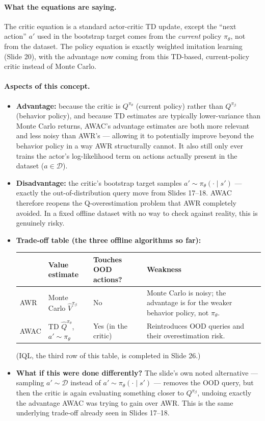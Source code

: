\documentclass[11pt]{article}
\begin{document}
\paragraph{What the equations are saying.}
The critic equation is a standard actor-critic TD update, except the ``next action''
$a'$ used in the bootstrap target comes from the \emph{current} policy $\pi_\theta$, not
from the dataset. The policy equation is exactly weighted imitation learning (Slide 20),
with the advantage now coming from this TD-based, current-policy critic instead of
Monte Carlo.

\paragraph{Aspects of this concept.}
\begin{itemize}
\item \textbf{Advantage:} because the critic is $Q^{\pi_\theta}$ (current policy) rather
than $Q^{\pi_\beta}$ (behavior policy), and because TD estimates are typically
lower-variance than Monte Carlo returns, AWAC's advantage estimates are both more
relevant and less noisy than AWR's --- allowing it to potentially improve beyond the
behavior policy in a way AWR structurally cannot. It also still only ever trains the
actor's log-likelihood term on actions actually present in the dataset ($a\in\mathcal{D}$).
\item \textbf{Disadvantage:} the critic's bootstrap target samples
$a'\sim\pi_\theta(\cdot\mid s')$ --- exactly the out-of-distribution query move from
Slides 17--18. AWAC therefore reopens the Q-overestimation problem that AWR completely
avoided. In a fixed offline dataset with no way to check against reality, this is
genuinely risky.
\item \textbf{Trade-off table (the three offline algorithms so far):}
\begin{center}
\begin{tabular}{@{}p{2cm}p{3.3cm}p{2.3cm}p{6.4cm}@{}}
\toprule
& Value estimate & Touches OOD actions? & Weakness \\
\midrule
AWR & Monte Carlo $\hat V^{\pi_\beta}$ & No & Monte Carlo is noisy; the advantage is for
the weaker behavior policy, not $\pi_\theta$. \\
AWAC & TD $\hat Q^{\pi_\theta}$, $a'\sim\pi_\theta$ & Yes (in the critic) & Reintroduces
OOD queries and their overestimation risk. \\
\bottomrule
\end{tabular}
\end{center}
(IQL, the third row of this table, is completed in Slide 26.)
\item \textbf{What if this were done differently?} The slide's own noted alternative ---
sampling $a'\sim\mathcal{D}$ instead of $a'\sim\pi_\theta(\cdot\mid s')$ --- removes the
OOD query, but then the critic is again evaluating something closer to $Q^{\pi_\beta}$,
undoing exactly the advantage AWAC was trying to gain over AWR. This is the same
underlying trade-off already seen in Slides 17--18.
\end{itemize}
\end{document}
